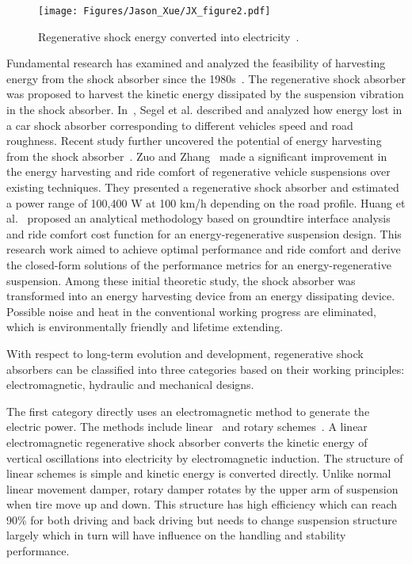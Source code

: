 \begin{figure}
\centering
\texttt{[image: Figures/Jason\_Xue/JX\_figure2.pdf]}
\caption{Regenerative shock energy converted into electricity~\cite{JX_75}.}
\label{JX_image2}
\end{figure}      

Fundamental research has examined and analyzed the feasibility of harvesting energy from the shock absorber since the 1980s~\cite{JX_61}. The regenerative shock absorber was proposed to harvest the kinetic energy dissipated by the suspension vibration in the shock absorber. In~\cite{JX_61}, Segel et al. described and analyzed how energy lost in a car shock absorber corresponding to different vehicles speed and road roughness. Recent study further uncovered the potential of energy harvesting from the shock absorber~\cite{JX_28,JX_78}. Zuo and Zhang~\cite{JX_78} made a significant improvement in the energy harvesting and ride comfort of regenerative vehicle suspensions over existing techniques. They presented a regenerative shock absorber and estimated a power range of 100,400 W at 100 km/h depending on the road profile. Huang et al.~\cite{JX_28} proposed an analytical methodology based on groundtire interface analysis and ride comfort cost function for an energy-regenerative suspension design. This research work aimed to achieve optimal performance and ride comfort and derive the closed-form solutions of the performance metrics for an energy-regenerative suspension. Among these initial theoretic study, the shock absorber was transformed into an energy harvesting device from an energy dissipating device. Possible noise and heat in the conventional working progress are eliminated, which is environmentally friendly and lifetime extending.

With respect to long-term evolution and development, regenerative shock absorbers can be classified into three categories based on their working principles: electromagnetic, hydraulic and mechanical designs.

The first category directly uses an electromagnetic method to generate the electric power. The methods include linear~\cite{JX_23,JX_33,JX_69,JX_72,JX_77} and rotary schemes~\cite{JX_24,JX_42}. A linear electromagnetic regenerative shock absorber converts the kinetic energy of vertical oscillations into electricity by electromagnetic induction. The structure of linear schemes is simple and kinetic energy is converted directly. Unlike normal linear movement damper, rotary damper rotates by the upper arm of suspension when tire move up and down. This structure has high efficiency which can reach 90\% for both driving and back driving but needs to change suspension structure largely which in turn will have influence on the handling and stability performance.

